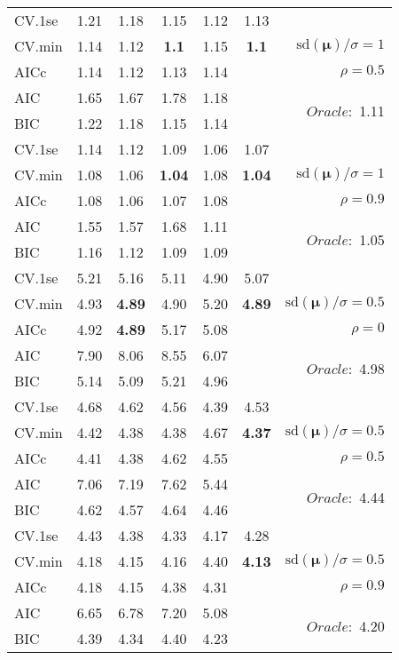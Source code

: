 \begin{table}
\begin{center}
\begin{tabular}{l*{5}{c}|r}
 \hline 
CV.1se & 1.21 & 1.18 & 1.15 & 1.12 & 1.13 & \\
CV.min & 1.14 & 1.12 & {\bf 1.1} & 1.15 & {\bf 1.1} &  $\mathrm{sd}(\mathbf{\mu})/\sigma=1$ \\
AICc & 1.14 & 1.12 & 1.13 & 1.14 & & $\rho=0.5$ \\
AIC & 1.65 & 1.67 & 1.78 & 1.18 & &  \multirow{2}{*}{$Oracle: $ 1.11} \\
BIC & 1.22 & 1.18 & 1.15 & 1.14 & &  \\
 \hline 
CV.1se & 1.14 & 1.12 & 1.09 & 1.06 & 1.07 & \\
CV.min & 1.08 & 1.06 & {\bf 1.04} & 1.08 & {\bf 1.04} &  $\mathrm{sd}(\mathbf{\mu})/\sigma=1$ \\
AICc & 1.08 & 1.06 & 1.07 & 1.08 & & $\rho=0.9$ \\
AIC & 1.55 & 1.57 & 1.68 & 1.11 & &  \multirow{2}{*}{$Oracle: $ 1.05} \\
BIC & 1.16 & 1.12 & 1.09 & 1.09 & &  \\
 \hline 
CV.1se & 5.21 & 5.16 & 5.11 & 4.90 & 5.07 & \\
CV.min & 4.93 & {\bf 4.89} & 4.90 & 5.20 & {\bf 4.89} &  $\mathrm{sd}(\mathbf{\mu})/\sigma=0.5$ \\
AICc & 4.92 & {\bf 4.89} & 5.17 & 5.08 & & $\rho=0$ \\
AIC & 7.90 & 8.06 & 8.55 & 6.07 & &  \multirow{2}{*}{$Oracle: $ 4.98} \\
BIC & 5.14 & 5.09 & 5.21 & 4.96 & &  \\
 \hline 
CV.1se & 4.68 & 4.62 & 4.56 & 4.39 & 4.53 & \\
CV.min & 4.42 & 4.38 & 4.38 & 4.67 & {\bf 4.37} &  $\mathrm{sd}(\mathbf{\mu})/\sigma=0.5$ \\
AICc & 4.41 & 4.38 & 4.62 & 4.55 & & $\rho=0.5$ \\
AIC & 7.06 & 7.19 & 7.62 & 5.44 & &  \multirow{2}{*}{$Oracle: $ 4.44} \\
BIC & 4.62 & 4.57 & 4.64 & 4.46 & &  \\
 \hline 
CV.1se & 4.43 & 4.38 & 4.33 & 4.17 & 4.28 & \\
CV.min & 4.18 & 4.15 & 4.16 & 4.40 & {\bf 4.13} &  $\mathrm{sd}(\mathbf{\mu})/\sigma=0.5$ \\
AICc & 4.18 & 4.15 & 4.38 & 4.31 & & $\rho=0.9$ \\
AIC & 6.65 & 6.78 & 7.20 & 5.08 & &  \multirow{2}{*}{$Oracle: $ 4.20} \\
BIC & 4.39 & 4.34 & 4.40 & 4.23 & &  \\
 \hline 
\end{tabular}
\end{center}
\vspace{-1cm}
\end{table}





